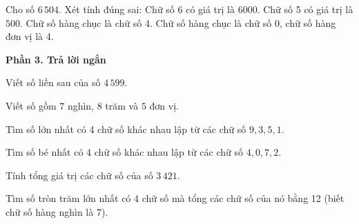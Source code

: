 \begin{ex} %
Cho số $6\,504$. Xét tính đúng sai:
\choiceTF
{\True Chữ số 6 có giá trị là $6000$.}
{\True Chữ số 5 có giá trị là $500$.}
{Chữ số hàng chục là chữ số 4.}
{\True Chữ số hàng chục là chữ số 0, chữ số hàng đơn vị là 4.}
\end{ex}

\textbf{Phần 3. Trả lời ngắn}

\begin{ex} %
Viết số liền sau của số $4\,599$.
\end{ex}

\begin{ex} %
Viết số gồm $7$ nghìn, $8$ trăm và $5$ đơn vị.
\end{ex}

\begin{ex} %
Tìm số lớn nhất có 4 chữ số khác nhau lập từ các chữ số $9, 3, 5, 1$.
\end{ex}

\begin{ex} %
Tìm số bé nhất có 4 chữ số khác nhau lập từ các chữ số $4, 0, 7, 2$.
\end{ex}

\begin{ex} %
Tính tổng giá trị các chữ số của số $3\,421$.
\end{ex}

\begin{ex} %
Tìm số tròn trăm lớn nhất có 4 chữ số mà tổng các chữ số của nó bằng 12 (biết chữ số hàng nghìn là 7).
\end{ex}
